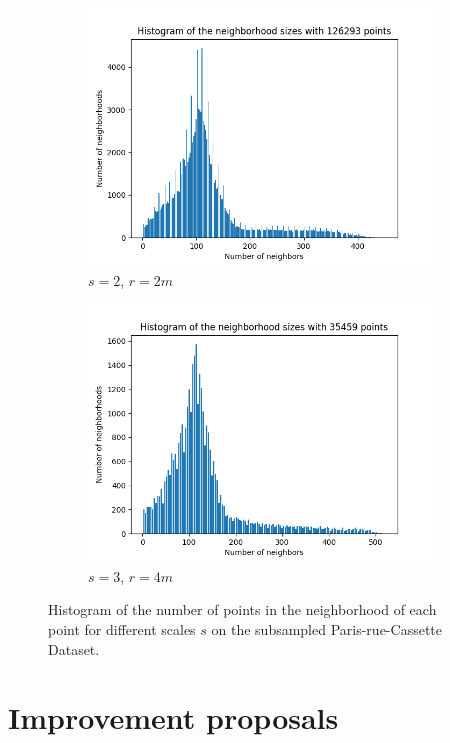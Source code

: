 \documentclass[a4paper, 11pt]{article}
\begin{document}
\begin{figure}
\begin{subfigure}{0.5\textwidth}
        \includegraphics[width=\textwidth]{../Figures/neigh_hist_scale2.png}
        \caption{$s=2$, $r=2m$}
    \end{subfigure}
    \hfill
    \begin{subfigure}{0.5\textwidth}
        \centering
        \includegraphics[width=\textwidth]{../Figures/neigh_hist_scale3.png}
        \caption{$s=3$, $r=4m$}
    \end{subfigure}
    \caption{Histogram of the number of points in the neighborhood of each point for different scales $s$ on the subsampled Paris-rue-Cassette Dataset.}
\end{figure}

\section{Improvement proposals}
\end{document}
